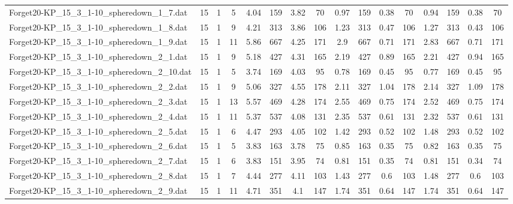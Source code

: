 \begin{sidewaystable}[!ht]
{\begin{tabular}{lccccccccccccccc}
Forget20-KP\_15\_3\_1-10\_spheredown\_1\_7.dat & 15 & 1 & 5 & 4.04 & 159 & 3.82 & 70 & 0.97 & 159 &  \textcolor{blue2}{0.38} & 70 & 0.94 & 159 &  \textcolor{blue2}{0.38} & 70 \\
Forget20-KP\_15\_3\_1-10\_spheredown\_1\_8.dat & 15 & 1 & 9 & 4.21 & 313 & 3.86 & 106 & 1.23 & 313 & 0.47 & 106 & 1.27 & 313 &  \textcolor{blue2}{0.43} & 106 \\
Forget20-KP\_15\_3\_1-10\_spheredown\_1\_9.dat & 15 & 1 & 11 & 5.86 & 667 & 4.25 & 171 & 2.9 & 667 &  \textcolor{blue2}{0.71} & 171 & 2.83 & 667 &  \textcolor{blue2}{0.71} & 171 \\
Forget20-KP\_15\_3\_1-10\_spheredown\_2\_1.dat & 15 & 1 & 9 & 5.18 & 427 & 4.31 & 165 & 2.19 & 427 & 0.89 & 165 & 2.21 & 427 & 0.94 & 165 \\
Forget20-KP\_15\_3\_1-10\_spheredown\_2\_10.dat & 15 & 1 & 5 & 3.74 & 169 & 4.03 & 95 & 0.78 & 169 & 0.45 & 95 & 0.77 & 169 & 0.45 & 95 \\
Forget20-KP\_15\_3\_1-10\_spheredown\_2\_2.dat & 15 & 1 & 9 & 5.06 & 327 & 4.55 & 178 & 2.11 & 327 &  \textcolor{blue2}{1.04} & 178 & 2.14 & 327 & 1.09 & 178 \\
Forget20-KP\_15\_3\_1-10\_spheredown\_2\_3.dat & 15 & 1 & 13 & 5.57 & 469 & 4.28 & 174 & 2.55 & 469 &  \textcolor{blue2}{0.75} & 174 & 2.52 & 469 &  \textcolor{blue2}{0.75} & 174 \\
Forget20-KP\_15\_3\_1-10\_spheredown\_2\_4.dat & 15 & 1 & 11 & 5.37 & 537 & 4.08 & 131 & 2.35 & 537 & 0.61 & 131 & 2.32 & 537 & 0.61 & 131 \\
Forget20-KP\_15\_3\_1-10\_spheredown\_2\_5.dat & 15 & 1 & 6 & 4.47 & 293 & 4.05 & 102 & 1.42 & 293 &  \textcolor{blue2}{0.52} & 102 & 1.48 & 293 &  \textcolor{blue2}{0.52} & 102 \\
Forget20-KP\_15\_3\_1-10\_spheredown\_2\_6.dat & 15 & 1 & 5 & 3.83 & 163 & 3.78 & 75 & 0.85 & 163 &  \textcolor{blue2}{0.35} & 75 & 0.82 & 163 &  \textcolor{blue2}{0.35} & 75 \\
Forget20-KP\_15\_3\_1-10\_spheredown\_2\_7.dat & 15 & 1 & 6 & 3.83 & 151 & 3.95 & 74 & 0.81 & 151 & 0.35 & 74 & 0.81 & 151 &  \textcolor{blue2}{0.34} & 74 \\
Forget20-KP\_15\_3\_1-10\_spheredown\_2\_8.dat & 15 & 1 & 7 & 4.44 & 277 & 4.11 & 103 & 1.43 & 277 &  \textcolor{blue2}{0.6} & 103 & 1.48 & 277 &  \textcolor{blue2}{0.6} & 103 \\
Forget20-KP\_15\_3\_1-10\_spheredown\_2\_9.dat & 15 & 1 & 11 & 4.71 & 351 & 4.1 & 147 & 1.74 & 351 & 0.64 & 147 & 1.74 & 351 & 0.64 & 147 \\

\end{tabular}}
\end{sidewaystable}
